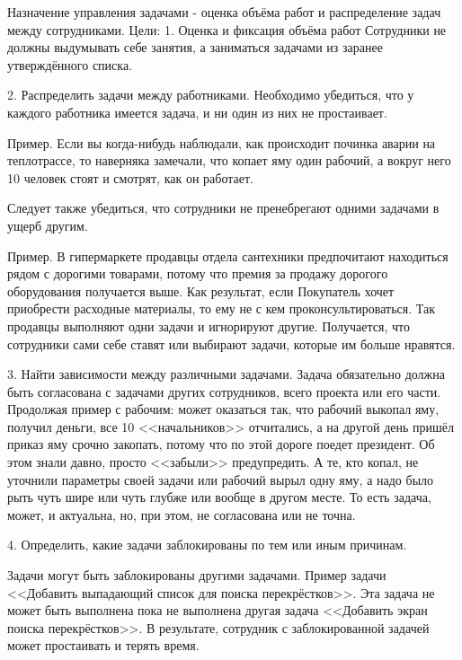 \documentclass{../industrial-development}
\begin{document}
Назначение управления задачами - оценка объёма работ и распределение задач между сотрудниками.
Цели:
1. Оценка и фиксация объёма работ
Сотрудники не должны выдумывать себе занятия, а заниматься задачами из заранее утверждённого списка.

2. Распределить задачи между работниками.
Необходимо убедиться, что у каждого работника имеется задача, и ни один из них не простаивает.

Пример. Если вы когда-нибудь наблюдали, как происходит починка аварии на теплотрассе, то наверняка замечали, что копает яму один рабочий, а вокруг него 10 человек стоят и смотрят, как он работает.

Следует также убедиться, что сотрудники не пренебрегают одними задачами в ущерб другим.

Пример. В гипермаркете продавцы отдела сантехники предпочитают находиться рядом с дорогими товарами, потому что премия за продажу дорогого оборудования получается выше. Как результат, если Покупатель хочет приобрести расходные материалы, то ему не с кем проконсультироваться. Так продавцы выполняют одни задачи и игнорируют другие. Получается, что сотрудники сами себе ставят или выбирают задачи, которые им больше нравятся.

3. Найти зависимости между различными задачами.
Задача обязательно должна быть согласована с задачами других сотрудников, всего проекта или его части. Продолжая пример с рабочим: может оказаться так, что рабочий выкопал яму, получил деньги, все 10 <<начальников>> отчитались, а на другой день пришёл приказ яму срочно закопать, потому что по этой дороге поедет президент. Об этом знали давно, просто <<забыли>> предупредить. А те, кто копал, не уточнили параметры своей задачи или рабочий вырыл одну яму, а надо было рыть чуть шире или чуть глубже или вообще в другом месте. То есть задача, может, и актуальна, но, при этом, не согласована или не точна.

4. Определить, какие задачи заблокированы по тем или иным причинам. 

Задачи могут быть заблокированы другими задачами. Пример задачи <<Добавить выпадающий список для поиска перекрёстков>>. Эта задача не может быть выполнена пока не выполнена другая задача <<Добавить экран поиска перекрёстков>>. В результате, сотрудник с заблокированной задачей может простаивать и терять время.
\end{document}
